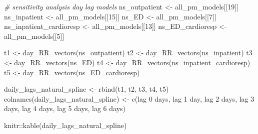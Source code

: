 \documentclass[
]{article}
\newenvironment{Shaded}{\begin{snugshade}}{\end{snugshade}}
\newcommand{\CommentTok}[1]{\textcolor[rgb]{0.56,0.35,0.01}{\textit{#1}}}
\newcommand{\DecValTok}[1]{\textcolor[rgb]{0.00,0.00,0.81}{#1}}
\newcommand{\FunctionTok}[1]{\textcolor[rgb]{0.00,0.00,0.00}{#1}}
\newcommand{\NormalTok}[1]{#1}
\newcommand{\OtherTok}[1]{\textcolor[rgb]{0.56,0.35,0.01}{#1}}
\newcommand{\SpecialCharTok}[1]{\textcolor[rgb]{0.00,0.00,0.00}{#1}}
\newcommand{\StringTok}[1]{\textcolor[rgb]{0.31,0.60,0.02}{#1}}
\begin{document}
\begin{Shaded}
\begin{Highlighting}[]
\CommentTok{\# sensitivity analysis day lag models}
\NormalTok{ns\_outpatient }\OtherTok{\textless{}{-}}\NormalTok{ all\_pm\_models[[}\DecValTok{19}\NormalTok{]]}
\NormalTok{ns\_inpatient }\OtherTok{\textless{}{-}}\NormalTok{ all\_pm\_models[[}\DecValTok{15}\NormalTok{]]}
\NormalTok{ns\_ED }\OtherTok{\textless{}{-}}\NormalTok{ all\_pm\_models[[}\DecValTok{7}\NormalTok{]]}
\NormalTok{ns\_inpatient\_cardioresp }\OtherTok{\textless{}{-}}\NormalTok{ all\_pm\_models[[}\DecValTok{13}\NormalTok{]]}
\NormalTok{ns\_ED\_cardioresp }\OtherTok{\textless{}{-}}\NormalTok{ all\_pm\_models[[}\DecValTok{5}\NormalTok{]]}

\NormalTok{t1 }\OtherTok{\textless{}{-}} \FunctionTok{day\_RR\_vectors}\NormalTok{(ns\_outpatient)}
\NormalTok{t2 }\OtherTok{\textless{}{-}} \FunctionTok{day\_RR\_vectors}\NormalTok{(ns\_inpatient)}
\NormalTok{t3 }\OtherTok{\textless{}{-}} \FunctionTok{day\_RR\_vectors}\NormalTok{(ns\_ED)}
\NormalTok{t4 }\OtherTok{\textless{}{-}} \FunctionTok{day\_RR\_vectors}\NormalTok{(ns\_inpatient\_cardioresp)}
\NormalTok{t5 }\OtherTok{\textless{}{-}} \FunctionTok{day\_RR\_vectors}\NormalTok{(ns\_ED\_cardioresp)}

\NormalTok{daily\_lags\_natural\_spline }\OtherTok{\textless{}{-}} \FunctionTok{rbind}\NormalTok{(t1, t2, t3, t4, t5)}
\FunctionTok{colnames}\NormalTok{(daily\_lags\_natural\_spline) }\OtherTok{\textless{}{-}}
  \FunctionTok{c}\NormalTok{(}\StringTok{\textquotesingle{}lag 0 days\textquotesingle{}}\NormalTok{, }\StringTok{\textquotesingle{}lag 1 day\textquotesingle{}}\NormalTok{, }\StringTok{\textquotesingle{}lag 2 days\textquotesingle{}}\NormalTok{, }\StringTok{\textquotesingle{}lag 3 days\textquotesingle{}}\NormalTok{,}
    \StringTok{\textquotesingle{}lag 4 days\textquotesingle{}}\NormalTok{, }\StringTok{\textquotesingle{}lag 5 days\textquotesingle{}}\NormalTok{, }\StringTok{\textquotesingle{}lag 6 days\textquotesingle{}}\NormalTok{)}

\NormalTok{knitr}\SpecialCharTok{::}\FunctionTok{kable}\NormalTok{(daily\_lags\_natural\_spline)}
\end{Highlighting}
\end{Shaded}
\end{document}
